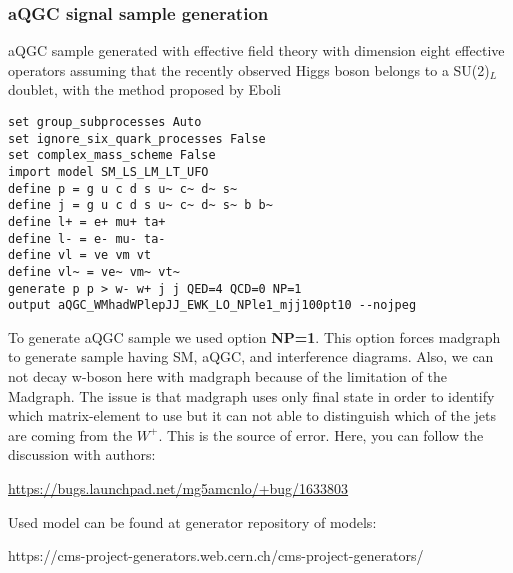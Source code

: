 \subsubsection{aQGC signal sample generation}
aQGC sample generated with effective field theory with dimension eight effective operators assuming that the recently observed Higgs boson belongs to a SU(2)$_{L}$ doublet, with the method proposed by Eboli~\cite{Belyaev:1998ih,Eboli:2006wa,Eboli:2000ad,Eboli:2003nq}
\begin{verbatim}
set group_subprocesses Auto
set ignore_six_quark_processes False
set complex_mass_scheme False
import model SM_LS_LM_LT_UFO
define p = g u c d s u~ c~ d~ s~ 
define j = g u c d s u~ c~ d~ s~ b b~
define l+ = e+ mu+ ta+
define l- = e- mu- ta-
define vl = ve vm vt
define vl~ = ve~ vm~ vt~
generate p p > w- w+ j j QED=4 QCD=0 NP=1
output aQGC_WMhadWPlepJJ_EWK_LO_NPle1_mjj100pt10 --nojpeg
\end{verbatim}
To generate aQGC sample we used option {\bf NP=1}. This option forces madgraph to generate sample having SM, aQGC, and interference diagrams.
Also, we can not decay w-boson here with madgraph because of the limitation of the Madgraph. The issue is that madgraph uses only final state in order to identify which matrix-element to use but it can not able to distinguish which of the jets are coming from the $W^+$. This is the source of error. Here, you can follow the discussion with authors:
\begin{sloppypar}
	\url{https://bugs.launchpad.net/mg5amcnlo/+bug/1633803}
\end{sloppypar}
Used model can be found at generator repository of models: 
\begin{sloppypar}
https://cms-project-generators.web.cern.ch/cms-project-generators/ 
\end{sloppypar}


